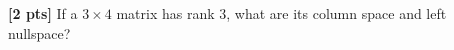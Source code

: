 \documentclass[11pt,addpoints,answers]{exam}
\numberwithin{equation}{section} %
\numberwithin{figure}{section} %
\numberwithin{table}{section} %
\begin{document}
\begin{questions}
    \begin{tcolorbox}[fit,height=5cm, width=\textwidth, blank, borderline={0.5pt}{-2pt},halign=center, valign=center, nobeforeafter]
    \end{tcolorbox}






\question \textbf{[2 pts]} If a $3{\times}4$ matrix has rank $3$, what are its column space and left nullspace?


\end{questions}
\end{document}

